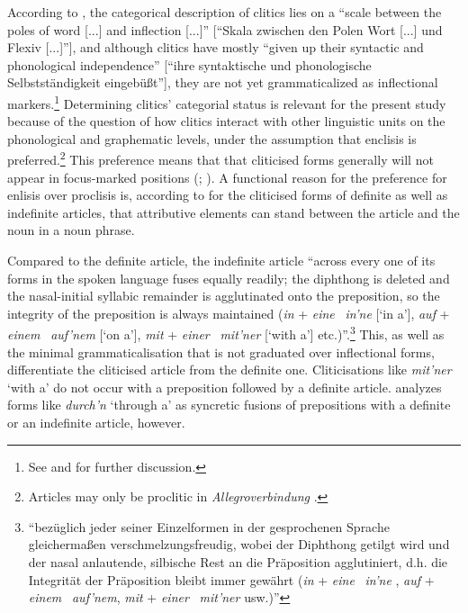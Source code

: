 According to \citet[11]{Nuebling1992}, the categorical description of clitics lies on a ``scale between the poles of word [...] and inflection [...]'' [``Skala zwischen den Polen Wort [...] und Flexiv [...]''], and although clitics have mostly ``given up their syntactic and phonological independence'' [``ihre syntaktische und phonologische Selbstständigkeit eingebüßt''], they are not yet grammaticalized as inflectional markers.\footnote{
	See \citet[36]{Nuebling1992} and \citet[98]{Prinz1991} for further discussion.}
Determining clitics' categorial status is relevant for the present study because of the question of how clitics interact with other linguistic units on the phonological and graphematic levels, under the assumption that enclisis is preferred.\footnote{
	Articles may only be proclitic in \textit{Allegroverbindung} \citep{Nuebling1992}.}
This preference means that that cliticised forms generally will not appear in focus-marked positions (\citealt[140]{Prinz1991}; \citealt[173]{Tophinke2002}).
A functional reason for the preference for enlisis over proclisis is, according to \citet{Nuebling2005} for the cliticised forms of definite as well as indefinite articles, that attributive elements can stand between the article and the noun in a noun phrase.

Compared to the definite article, the indefinite article ``across every one of its forms in the spoken language fuses equally readily; the diphthong is deleted and the nasal-initial syllabic remainder is agglutinated onto the preposition, so the integrity of the preposition is always maintained (\textit{in} + \textit{eine} \rightarrow\ \textit{in'ne} [`in a'], \textit{auf} + \textit{einem} \rightarrow\ \textit{auf'nem} [`on a'], \textit{mit} + \textit{einer} \rightarrow\ \textit{mit'ner} [`with a'] etc.)''.\footnote{
	``bezüglich jeder seiner Einzelformen in der gesprochenen Sprache gleichermaßen verschmelzungsfreudig, wobei der Diphthong getilgt wird und der nasal anlautende, silbische Rest an die Präposition agglutiniert, d.h. die Integrität der Präposition bleibt immer gewährt (\textit{in} + \textit{eine} \rightarrow\ \textit{in'ne} , \textit{auf} + \textit{einem} \rightarrow\ \textit{auf'nem}, \textit{mit} + \textit{einer} \rightarrow\ \textit{mit'ner} usw.)''}
This, as well as the minimal grammaticalisation that is not graduated over inflectional forms, differentiate the cliticised article from the definite one.
Cliticisations like \textit{mit'ner} `with a' do not occur with a preposition followed by a definite article.
\citet[95]{Dedenbach1987} analyzes forms like \textit{durch'n} `through a' as syncretic fusions of prepositions with a definite or an indefinite article, however.

